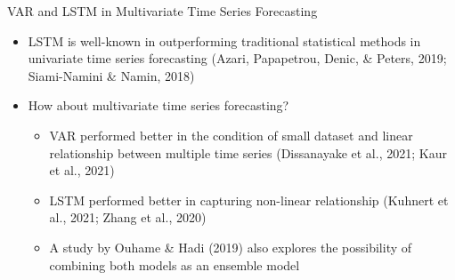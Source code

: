 \documentclass[aspectratio=169]{beamer}
\begin{document}



\begin{frame}{VAR and LSTM in Multivariate Time Series Forecasting}
    \begin{itemize}
        \item LSTM is well-known in outperforming traditional statistical methods in univariate time series forecasting (Azari, Papapetrou, Denic, \& Peters, 2019; Siami-Namini \& Namin, 2018)
        \item How about multivariate time series forecasting?
        \begin{itemize}
            \item VAR performed better in the condition of small dataset and linear relationship between multiple time series (Dissanayake et al., 2021; Kaur et al., 2021)
            \item LSTM performed better in capturing non-linear relationship (Kuhnert et al., 2021; Zhang et al., 2020)
            \item A study by Ouhame & Hadi (2019) also explores the possibility of combining both models as an ensemble model
        \end{itemize}
    \end{itemize}
\end{frame}
\end{document}
